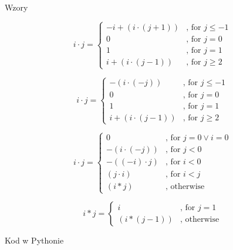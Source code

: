 \begin{frame}[allowframebreaks]{Wzory}
    \begin{definition}[recursion 1]
        \[ i \cdot j =
        \begin{cases}
            -i + (i \cdot (j+1)) & \text{, for } j \leq -1 \\
            0 & \text{, for } j = 0 \\
            1 & \text{, for } j = 1 \\
            i + (i \cdot (j-1)) & \text{, for } j \geq 2
        \end{cases}
        \]
    \end{definition}
    \begin{definition}[recursion 2]
        \[ i \cdot j =
        \begin{cases}
            -(i \cdot (-j)) & \text{, for } j \leq -1 \\
            0 & \text{, for } j = 0 \\
            1 & \text{, for } j = 1 \\
            i + (i \cdot (j-1)) & \text{, for } j \geq 2
        \end{cases}
        \]
    \end{definition}
    \begin{definition}[recursion 3.1]
        \[ i \cdot j =
        \begin{cases}
            0 & \text{, for } j = 0 \lor i = 0 \\
            -(i \cdot (-j)) & \text{, for } j < 0 \\
            -((-i) \cdot j) & \text{, for } i < 0 \\
            (j \cdot i) & \text{, for } i < j \\
            (i * j) & \text{, otherwise}
        \end{cases}
        \]
    \end{definition}
    \begin{definition}[recursion 3.2]
        \[ i * j =
        \begin{cases}
            i & \text{, for } j = 1 \\
            (i * (j-1)) & \text{, otherwise}
        \end{cases}
        \]
    \end{definition}
\end{frame}
\begin{frame}{Kod w Pythonie}
    
    
    
\end{frame}
